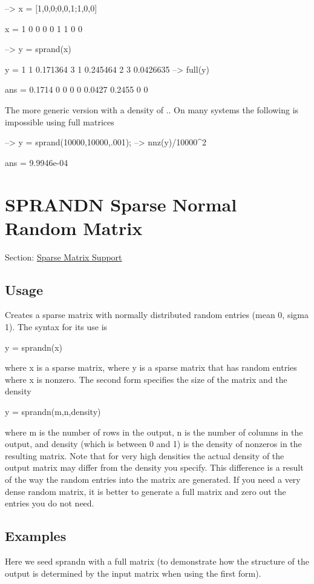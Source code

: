 \begin{DoxyVerbInclude}
--> x = [1,0,0;0,0,1;1,0,0]

x = 
 1 0 0 
 0 0 1 
 1 0 0 

--> y = sprand(x)

y = 
 1 1 0.171364
 3 1 0.245464
 2 3 0.0426635
--> full(y)

ans = 
    0.1714         0         0 
         0         0    0.0427 
    0.2455         0         0 
\end{DoxyVerbInclude}


The more generic version with a density of {.}. On many systems the following is impossible using full matrices


\begin{DoxyVerbInclude}
--> y = sprand(10000,10000,.001);
--> nnz(y)/10000^2

ans = 
 9.9946e-04 
\end{DoxyVerbInclude}
 \hypertarget{sparse_sprandn}{}\section{S\-P\-R\-A\-N\-D\-N Sparse Normal Random Matrix}\label{sparse_sprandn}
Section\-: \hyperlink{sec_sparse}{Sparse Matrix Support} \hypertarget{vtkwidgets_vtkxyplotwidget_Usage}{}\subsection{Usage}\label{vtkwidgets_vtkxyplotwidget_Usage}
Creates a sparse matrix with normally distributed random entries (mean 0, sigma 1). The syntax for its use is \begin{DoxyVerb}  y = sprandn(x)
\end{DoxyVerb}
 where {\ttfamily x} is a sparse matrix, where {\ttfamily y} is a sparse matrix that has random entries where {\ttfamily x} is nonzero. The second form specifies the size of the matrix and the density \begin{DoxyVerb}  y = sprandn(m,n,density)
\end{DoxyVerb}
 where {\ttfamily m} is the number of rows in the output, {\ttfamily n} is the number of columns in the output, and {\ttfamily density} (which is between 0 and 1) is the density of nonzeros in the resulting matrix. Note that for very high densities the actual density of the output matrix may differ from the density you specify. This difference is a result of the way the random entries into the matrix are generated. If you need a very dense random matrix, it is better to generate a full matrix and zero out the entries you do not need. \hypertarget{variables_matrix_Examples}{}\subsection{Examples}\label{variables_matrix_Examples}
Here we seed {\ttfamily sprandn} with a full matrix (to demonstrate how the structure of the output is determined by the input matrix when using the first form).


